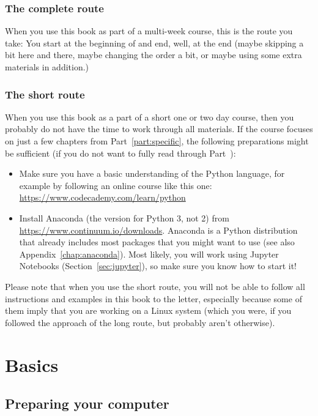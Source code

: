 \documentclass[a4paper,12pt]{book}
\begin{document}
\section*{The complete route}
When you use this book as part of a multi-week course, this is the route you take: You start at the beginning of and end, well, at the end (maybe skipping a bit here and there, maybe changing the order a bit, or maybe using some extra materials in addition.)

\section*{The short route}
When you use this book as a part of a short one or two day course, then you probably do not have the time to work through all materials. If the course focuses on just a few chapters from Part~\ref{part:specific}, the following preparations might be sufficient (if you do not want to fully read through Part~\ref{part:basics}):
\begin{itemize}
\item Make sure you have a basic understanding of the Python language, for example by following an online course like this one: \url{https://www.codecademy.com/learn/python}
	\item Install Anaconda (the version for Python 3, not 2) from  \url{https://www.continuum.io/downloads}. Anaconda is a Python distribution that already includes most packages that you might want to use (see also Appendix~\ref{chap:anaconda}). Most likely, you will work using Jupyter Notebooks (Section~\ref{sec:jupyter}), so make sure you know how to start it!
\end{itemize}
Please note that when you use the short route, you will not be able to follow all instructions and examples in this book to the letter, especially because some of them imply that you are working on a Linux system (which you were, if you followed the approach of the long route, but probably aren't otherwise).



\mainmatter

\part{Basics}
\label{part:basics}

\chapter{Preparing your computer}
\label{chap:prepare}
\end{document}
